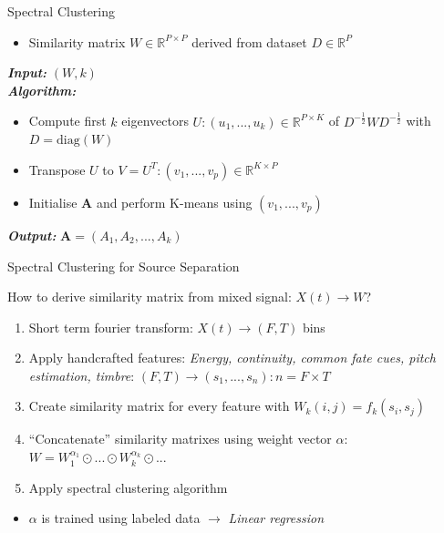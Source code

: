\documentclass[xcolor=table,mathserif,9pt]{beamer}    %
\begin{document}
\begin{frame}{Spectral Clustering}
\begin{itemize}
	\item Similarity matrix $W \in \mathbb{R}^{P \times P}$ derived from dataset $D \in \mathbb{R}^P$
\end{itemize}
\vspace{10mm}
\begin{algorithm}[H]
	\LinesNumbered
	\emph{\textbf{Input: }} $(W, k)$ \\
	\emph{\textbf{Algorithm: }}
	\begin{itemize}
		\item Compute first $k$ eigenvectors $U: (u_1,... ,u_k) \in \mathbb{R}^{P \times K}$ of $D^{-\frac{1}{2}}WD^{-\frac{1}{2}}$ with $D = \text{diag}(W)$
		\item Transpose $U$ to $V = U^T: (v_1,... ,v_p) \in \mathbb{R}^{K \times P}$ 
		\item Initialise \textbf{A} and perform K-means using $(v_1,... ,v_p)$ 
	\end{itemize}
	\emph{\textbf{Output: }}$\textbf{A} = (A_1, A_2, ..., A_k)$
\end{algorithm}
\end{frame}

\begin{frame}{Spectral Clustering for Source Separation \cite{Bach:2006}}
	
How to derive similarity matrix from mixed signal: \emph{$X(t) \to W$}?
\vspace{10mm}
\begin{enumerate}
	\item Short term fourier transform: $X(t) \to (F,T)$ bins
	\item Apply handcrafted features: \emph{Energy, continuity, common fate cues, pitch estimation, timbre}: $(F,T) \to (s_1, ...,s_n): n = F \times T$
	\item Create similarity matrix for every feature with $W_k(i,j) = f_k(s_i,s_j)$
	\item ``Concatenate'' similarity matrixes using weight vector $\alpha$: $W = W_1^{\alpha_1} \odot ... \odot W_k^{\alpha_k} \odot ...$ 
	\item Apply spectral clustering algorithm 
\end{enumerate}
\vspace{10mm}

\begin{itemize}
	\item $\alpha$ is trained using labeled data $\to$ \emph{Linear regression}
\end{itemize}


\end{frame}
\end{document}
